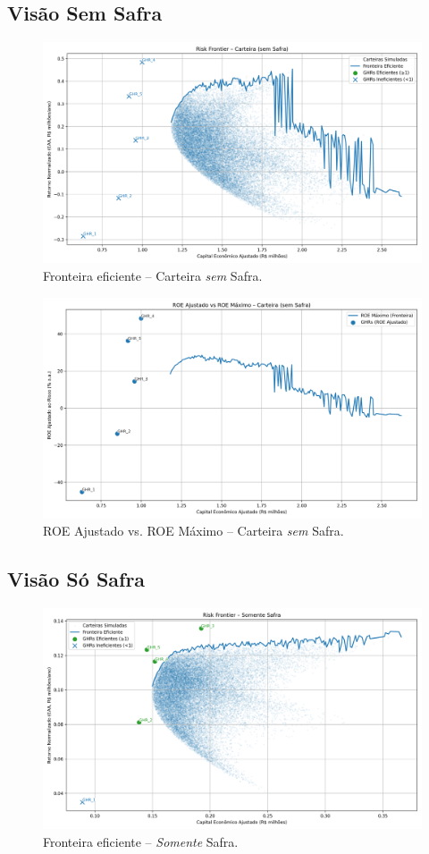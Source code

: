 \documentclass[11pt,a4paper]{article}
\newcommand{\1}{\mathbf{1}}
\begin{document}
\subsection*{Visão Sem Safra}
\begin{figure}[H]\centering
\includegraphics[width=.85\linewidth]{fronteira_sem_safra.png}
\caption{Fronteira eficiente – Carteira \emph{sem} Safra.}
\end{figure}

\begin{figure}[H]\centering
\includegraphics[width=.85\linewidth]{roe_maximo_sem_safra.png}
\caption{ROE Ajustado vs. ROE Máximo – Carteira \emph{sem} Safra.}
\end{figure}

\subsection*{Visão Só Safra}
\begin{figure}[H]\centering
\includegraphics[width=.85\linewidth]{fronteira_safra.png}
\caption{Fronteira eficiente – \emph{Somente} Safra.}
\end{figure}
\end{document}
